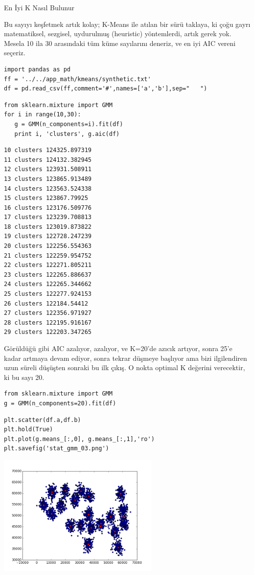 \documentclass[12pt,fleqn]{article}\usepackage{../../common}
\begin{document}
En İyi K Nasıl Bulunur

Bu sayıyı keşfetmek artık kolay; K-Means ile atılan bir sürü taklaya, ki
çoğu gayrı matematiksel, sezgisel, uydurulmuş (heuristic) yöntemlerdi,
artık gerek yok. Mesela 10 ila 30 arasındaki tüm küme sayılarını deneriz,
ve en iyi AIC vereni seçeriz.

\begin{verbatim}
import pandas as pd
ff = '../../app_math/kmeans/synthetic.txt'
df = pd.read_csv(ff,comment='#',names=['a','b'],sep="   ")
\end{verbatim}

\begin{verbatim}
from sklearn.mixture import GMM
for i in range(10,30):
   g = GMM(n_components=i).fit(df)
   print i, 'clusters', g.aic(df)
\end{verbatim}

\begin{verbatim}
10 clusters 124325.897319
11 clusters 124132.382945
12 clusters 123931.508911
13 clusters 123865.913489
14 clusters 123563.524338
15 clusters 123867.79925
16 clusters 123176.509776
17 clusters 123239.708813
18 clusters 123019.873822
19 clusters 122728.247239
20 clusters 122256.554363
21 clusters 122259.954752
22 clusters 122271.805211
23 clusters 122265.886637
24 clusters 122265.344662
25 clusters 122277.924153
26 clusters 122184.54412
27 clusters 122356.971927
28 clusters 122195.916167
29 clusters 122203.347265
\end{verbatim}

Görüldüğü gibi AIC azalıyor, azalıyor, ve K=20'de azıcık artıyor, sonra
25'e kadar artmaya devam ediyor, sonra tekrar düşmeye başlıyor ama bizi
ilgilendiren uzun süreli düşüşten sonraki bu ilk çıkış. O nokta optimal K
değerini verecektir, ki bu sayı 20.

\begin{verbatim}
from sklearn.mixture import GMM
g = GMM(n_components=20).fit(df)
\end{verbatim}

\begin{verbatim}
plt.scatter(df.a,df.b)
plt.hold(True)
plt.plot(g.means_[:,0], g.means_[:,1],'ro')
plt.savefig('stat_gmm_03.png')
\end{verbatim}

\includegraphics[height=6cm]{stat_gmm_03.png}
\end{document}
